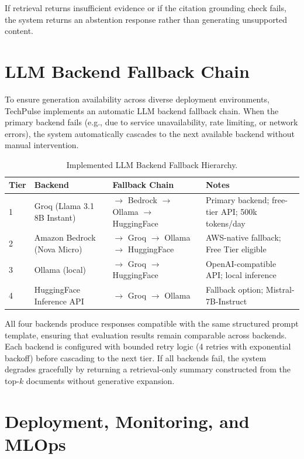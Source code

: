 If retrieval returns insufficient evidence or if the citation grounding check fails, the system returns an abstention response rather than generating unsupported content.

\section{LLM Backend Fallback Chain}
\label{sec:llm_fallback}

To ensure generation availability across diverse deployment environments, TechPulse implements an automatic LLM backend fallback chain. When the primary backend fails (e.g., due to service unavailability, rate limiting, or network errors), the system automatically cascades to the next available backend without manual intervention.

\begin{table}[H]
\caption{Implemented LLM Backend Fallback Hierarchy.}
\label{tab:llm_backends}
\centering
\begin{tabular}{p{0.5cm}p{3.5cm}p{4.0cm}p{4.0cm}}
\toprule
\textbf{Tier} & \textbf{Backend} & \textbf{Fallback Chain} & \textbf{Notes} \\
\midrule
1 & Groq (Llama 3.1 8B Instant) & $\to$ Bedrock $\to$ Ollama $\to$ HuggingFace & Primary backend; free-tier API; 500k tokens/day \\[4pt]
2 & Amazon Bedrock (Nova Micro) & $\to$ Groq $\to$ Ollama $\to$ HuggingFace & AWS-native fallback; Free Tier eligible \\[4pt]
3 & Ollama (local) & $\to$ Groq $\to$ HuggingFace & OpenAI-compatible API; local inference \\[4pt]
4 & HuggingFace Inference API & $\to$ Groq $\to$ Ollama & Fallback option; Mistral-7B-Instruct \\
\bottomrule
\end{tabular}
\end{table}

All four backends produce responses compatible with the same structured prompt template, ensuring that evaluation results remain comparable across backends. Each backend is configured with bounded retry logic (4 retries with exponential backoff) before cascading to the next tier. If all backends fail, the system degrades gracefully by returning a retrieval-only summary constructed from the top-$k$ documents without generative expansion.

\section{Deployment, Monitoring, and MLOps}
\label{sec:mlops}

